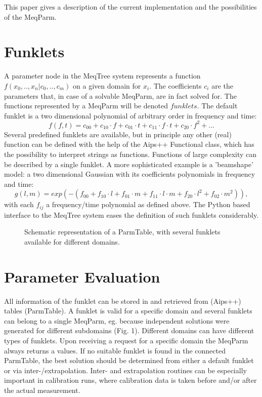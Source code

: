 \documentclass[11pt,twoside]{article}  %
\begin{document}
This paper gives a description of the current implementation and
the possibilities of the MeqParm. 

\section{Funklets} 

A parameter node in the MeqTree system represents a function $f(x_0,..,x_n|c_0,..,c_m)$ on a given
domain for $x_i$. The coefficients $c_i$ are the parameters that, in case of a solvable MeqParm, are in
fact solved for. The functions represented by a MeqParm will be
denoted  $funklets$. The default funklet is a two dimensional
polynomial of arbitrary order in frequency and time:
\begin{equation}
f(f,t) = c_{00} + c_{10}\cdot f + c_{01} \cdot t + c_{11} \cdot f\cdot
t + c_{20}\cdot f^2 + ...
\end{equation}
Several predefined funklets are available, but in principle any other (real)
function can be defined with the help of the Aips++ Functional
class, which has the possibility to interpret strings as functions.
Functions of large complexity can be described by a single funklet. A more sophisticated
example is a 'beamshape' model: a two dimensional Gaussian with its coefficients
polynomials  in frequency and time:
\begin{equation}
g(l,m) = exp(-(f_{00}+f_{10}\cdot l+f_{01}\cdot m+f_{11}\cdot l\cdot m +
f_{20}\cdot l^2 + f_{02}\cdot m^2)),
\end{equation}
with each $f_{ij}$ a frequency/time polynomial as defined above. 
The Python based  interface to the MeqTree system eases the definition of such funklets considerably.


\begin{figure}\label{parmtable}
\caption{Schematic representation of a ParmTable, with several
funklets available for different domains.}
\end{figure}


\section{Parameter Evaluation}
All information of the funklet can be stored in and retrieved from
(Aips++) tables (ParmTable). A funklet is valid for a specific
domain and several funklets can belong to a single MeqParm, eg. 
because independent solutions were generated for different
subdomains (Fig. 1).
Different domains can have different types of funklets. Upon receiving
a request for a specific domain the MeqParm always returns a
values. If no suitable funklet is found in the connected ParmTable,
the best solution should be determined from either a default funklet
or via inter-/extrapolation. Inter- and extrapolation routines can be especially important in
calibration runs, where calibration data is  taken before and/or after
the actual measurement.
\end{document}

